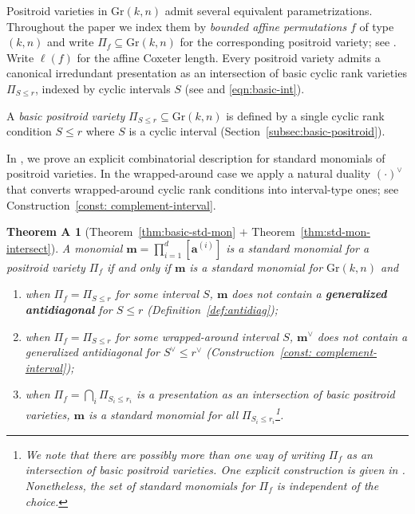 \documentclass[12pt,reqno]{amsart}
\newtheorem*{thmA}{Theorem A}
\theoremstyle{definition}
\renewcommand{\aa}{\mathbf a}
\newcommand{\mm}{\mathbf m}
\newcommand{\gr}{\mathrm{Gr}}
\begin{document}
Positroid varieties in $\gr(k,n)$ admit several equivalent parametrizations.
Throughout the paper we index them by \emph{bounded affine permutations} $f$ of type $(k,n)$ and write
$\Pi_f\subseteq \gr(k,n)$ for the corresponding positroid variety; see .
Write $\ell(f)$ for the affine Coxeter length.
Every positroid variety admits a canonical irredundant presentation as an intersection of basic cyclic rank varieties
$\Pi_{S\le r}$, indexed by cyclic intervals $S$ (see  and \eqref{eqn:basic-int}).


A \emph{basic positroid variety} $\Pi_{S\le r}\subseteq \gr(k,n)$ is defined by a single cyclic rank condition $S\le r$ where $S$ is a cyclic interval (Section~\ref{subsec:basic-positroid}). 

In , we prove an explicit combinatorial description for standard monomials of positroid varieties. In the wrapped-around case we apply a natural duality $(\cdot)^\vee$
that converts wrapped-around cyclic rank conditions into interval-type ones;
see Construction~\ref{const: complement-interval}.

\begin{thmA}[Theorem~\ref{thm:basic-std-mon} $+$ Theorem~\ref{thm:std-mon-intersect}]
    A monomial $\mm = \prod_{i = 1}^d [\aa^{(i)}]$ is a standard monomial for a positroid variety $\Pi_f$ if and only if $\mm$ is a standard monomial for $\gr(k,n)$ and 
    \begin{enumerate}
        \item when $\Pi_f = \Pi_{S\leq r}$ for some  interval $S$, $\mm$ does not contain a \textbf{generalized antidiagonal} for $S\leq r$ (Definition~\ref{def:antidiag});
        \item when $\Pi_f = \Pi_{S\leq r}$ for some wrapped-around interval $S$, $\mm^\vee$ does not contain a generalized antidiagonal for $S^\vee\leq r^\vee$ (Construction~\ref{const: complement-interval});
    \item when $\Pi_f=\bigcap_i \Pi_{S_i\le r_i}$ is a presentation as an intersection of basic positroid varieties,
$\mm$ is a standard monomial for all $\Pi_{S_i\le r_i}$\footnote{We note that there are possibly more than one way of writing $\Pi_f$ as an intersection of basic positroid varieties. One explicit construction is given in . Nonetheless, the set of standard monomials for $\Pi_f$ is independent of the choice.}.
    \end{enumerate}
\end{thmA}
\end{document}
